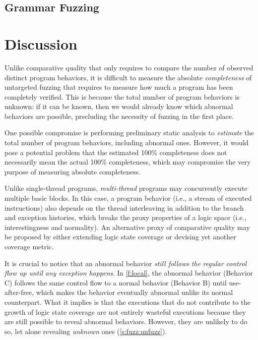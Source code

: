 \documentclass[letterpaper,twocolumn,10pt]{article}
\begin{document}

\subsection{Grammar Fuzzing}



\section{Discussion}
\label{s:disc}

%
Unlike comparative quality that only requires to compare the number of observed
distinct program behaviors, it is difficult to measure the absolute
\emph{completeness} of untargeted fuzzing that requires to measure how much a
program has been completely verified. This is because the total number of
program behaviors is unknown: if it can be known, then we would already know
which abnormal behaviors are possible, precluding the necessity of fuzzing in
the first place.

One possible compromise is performing preliminary static analysis to
\emph{estimate} the total number of program behaviors, including abnormal ones.
However, it would pose a potential problem that the estimated 100\% completeness
does not necessarily mean the actual 100\% completeness, which may compromise
the very purpose of measuring absolute completeness.

%
Unlike single-thread programs, \emph{multi-thread} programs may concurrently
execute multiple basic blocks. In this case, a program behavior (i.e., a stream
of executed instructions) also depends on the thread interleaving in
addition to the branch and exception histories, which breaks the proxy
properties of a logic space (i.e., interestingness and normality).
An alternative proxy of comparative quality may be proposed by either
extending logic state coverage or devising yet another coverage metric.

%
It is crucial to notice that an abnormal behavior \emph{still follows the
regular control flow up until any exception happens}. In \autoref{f:local}, the
abnormal behavior (Behavior C) follows the same control flow to a normal
behavior (Behavior B) until use-after-free, which makes the behavior eventually
abnormal unlike its normal counterpart. 
%
What it implies is that the executions that do not contribute to the growth of
logic state coverage are not entirely wasteful executions because they are still
possible to reveal abnormal behaviors. However, they are unlikely to do so, let
alone revealing \emph{unknown} ones (\autoref{s:fuzz:unfuzz}).
\end{document}
